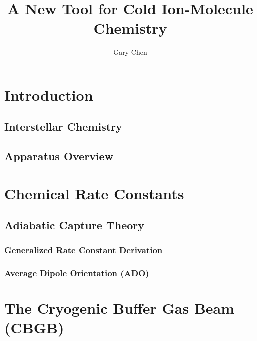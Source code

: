 \documentclass [PhD,nolistoftables,scheader] {uclathes}
\title          {A New Tool for Cold Ion-Molecule Chemistry}
\author         {Gary Chen}
\begin{document}
\makeintropages


\chapter{Introduction}

	
	\section{Interstellar Chemistry}
	

	\section{Apparatus Overview}
	
	
\chapter{Chemical Rate Constants}
	
	
	\section{Adiabatic Capture Theory}
	
	
		\subsection{Generalized Rate Constant Derivation} \label{sec: ACT}
		
		
		\subsection{Average Dipole Orientation (ADO)} \label{sec: ADO}
		
	

\chapter{The Cryogenic Buffer Gas Beam (CBGB)}

\end{document}
